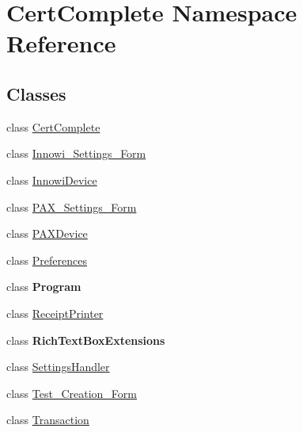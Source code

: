 \hypertarget{namespace_cert_complete}{}\section{Cert\+Complete Namespace Reference}
\label{namespace_cert_complete}
\subsection*{Classes}
\begin{DoxyCompactItemize}
\item 
class \mbox{\hyperlink{class_cert_complete_1_1_cert_complete}{Cert\+Complete}}
\item 
class \mbox{\hyperlink{class_cert_complete_1_1_innowi___settings___form}{Innowi\+\_\+\+Settings\+\_\+\+Form}}
\item 
class \mbox{\hyperlink{class_cert_complete_1_1_innowi_device}{Innowi\+Device}}
\item 
class \mbox{\hyperlink{class_cert_complete_1_1_p_a_x___settings___form}{P\+A\+X\+\_\+\+Settings\+\_\+\+Form}}
\item 
class \mbox{\hyperlink{class_cert_complete_1_1_p_a_x_device}{P\+A\+X\+Device}}
\item 
class \mbox{\hyperlink{class_cert_complete_1_1_preferences}{Preferences}}
\item 
class {\bfseries Program}
\item 
class \mbox{\hyperlink{class_cert_complete_1_1_receipt_printer}{Receipt\+Printer}}
\item 
class {\bfseries Rich\+Text\+Box\+Extensions}
\item 
class \mbox{\hyperlink{class_cert_complete_1_1_settings_handler}{Settings\+Handler}}
\item 
class \mbox{\hyperlink{class_cert_complete_1_1_test___creation___form}{Test\+\_\+\+Creation\+\_\+\+Form}}
\item 
class \mbox{\hyperlink{class_cert_complete_1_1_transaction}{Transaction}}
\end{DoxyCompactItemize}
